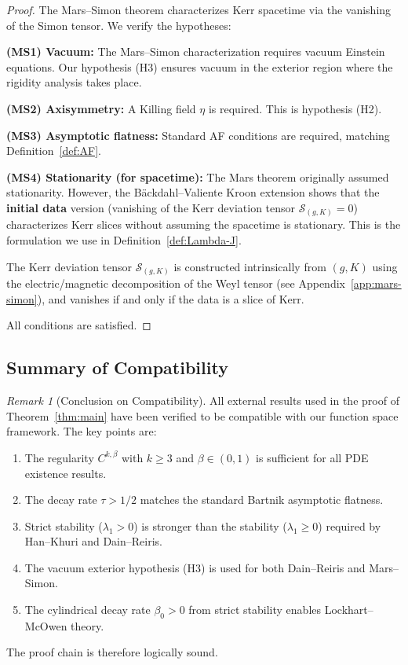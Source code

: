 \documentclass[12pt]{article}
\theoremstyle{plain}
\theoremstyle{definition}
\theoremstyle{remark}
\newtheorem{remark}[theorem]{Remark}
\begin{document}
\begin{proof}
The Mars--Simon theorem characterizes Kerr spacetime via the vanishing of the Simon tensor. We verify the hypotheses:

\textbf{(MS1) Vacuum:} The Mars--Simon characterization requires vacuum Einstein equations. Our hypothesis (H3) ensures vacuum in the exterior region where the rigidity analysis takes place.

\textbf{(MS2) Axisymmetry:} A Killing field $\eta$ is required. This is hypothesis (H2).

\textbf{(MS3) Asymptotic flatness:} Standard AF conditions are required, matching Definition~\ref{def:AF}.

\textbf{(MS4) Stationarity (for spacetime):} The Mars theorem originally assumed stationarity. However, the B\"ackdahl--Valiente Kroon extension \cite{backdahl2010a, backdahl2010b} shows that the \textbf{initial data} version (vanishing of the Kerr deviation tensor $\mathcal{S}_{(g,K)} = 0$) characterizes Kerr slices without assuming the spacetime is stationary. This is the formulation we use in Definition~\ref{def:Lambda-J}.

The Kerr deviation tensor $\mathcal{S}_{(g,K)}$ is constructed intrinsically from $(g, K)$ using the electric/magnetic decomposition of the Weyl tensor (see Appendix~\ref{app:mars-simon}), and vanishes if and only if the data is a slice of Kerr.

All conditions are satisfied. \qedhere
\end{proof}

\subsection{Summary of Compatibility}

\begin{remark}[Conclusion on Compatibility]
All external results used in the proof of Theorem~\ref{thm:main} have been verified to be compatible with our function space framework. The key points are:
\begin{enumerate}[label=(\arabic*)]
    \item The regularity $C^{k,\beta}$ with $k \geq 3$ and $\beta \in (0,1)$ is sufficient for all PDE existence results.
    \item The decay rate $\tau > 1/2$ matches the standard Bartnik asymptotic flatness.
    \item Strict stability ($\lambda_1 > 0$) is stronger than the stability ($\lambda_1 \geq 0$) required by Han--Khuri and Dain--Reiris.
    \item The vacuum exterior hypothesis (H3) is used for both Dain--Reiris and Mars--Simon.
    \item The cylindrical decay rate $\beta_0 > 0$ from strict stability enables Lockhart--McOwen theory.
\end{enumerate}
The proof chain is therefore logically sound.
\end{remark}
\end{document}
